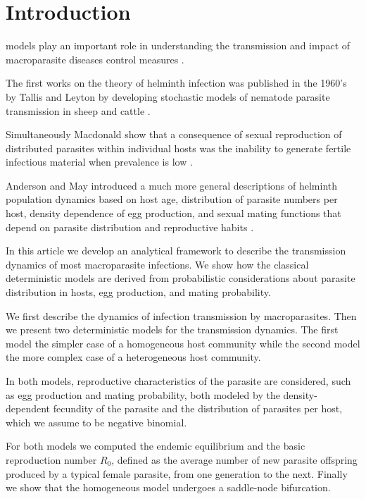 \documentclass[eng]{MMSB-class-eng}
\begin{document}
\newpage
\section{Introduction}
 models play an important role in understanding the transmission and impact of macroparasite diseases control measures \citep{anderson1992infectious,anderson2014coverage,truscott2016soil}.

The first works on the theory of helminth infection was published in the 1960's by Tallis and Leyton by developing stochastic models of nematode parasite transmission in sheep and cattle \citep{leyton1968stochastic,tallis1966stochastic,tallis1969stochastic}.

Simultaneously Macdonald show that a consequence of sexual reproduction of distributed parasites within individual hosts was the inability to generate fertile infectious material when prevalence is low \citep{macdonald1965dynamics}.


{\color{red}
Anderson and May introduced a much more general descriptions of helminth population dynamics based on host age, distribution of parasite numbers per host, density dependence of egg production, and sexual mating functions that depend on parasite distribution and reproductive habits \citep{anderson1982population,anderson1992infectious}.
}

{\color{red}
In this article we develop an analytical framework to describe the transmission dynamics of most macroparasite infections. We show how the classical deterministic models are derived from probabilistic considerations about parasite distribution in hosts, egg production, and mating probability. 


We first describe the dynamics of infection transmission by macroparasites. 
Then we present two deterministic models for the transmission dynamics. The first model the simpler case of  a homogeneous host community while the second model the more complex case of a heterogeneous host community.
}

In both models, reproductive characteristics of the parasite are considered, such as egg production and mating probability, both modeled by the density-dependent fecundity of the parasite and the distribution of parasites per host, which we assume to be negative binomial.	


{\color{red}
For both models we computed the endemic equilibrium  and the basic reproduction number $R_0$, defined  as the average number of new parasite offspring produced by a typical 
female parasite, from one generation to the next. Finally  we show that the homogeneous model undergoes a saddle-node bifurcation. 
}
\end{document}
